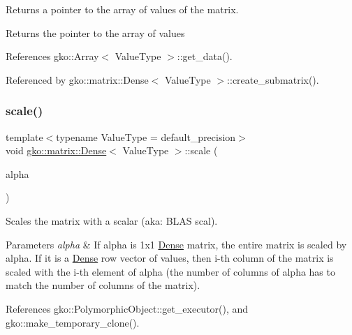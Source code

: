 Returns a pointer to the array of values of the matrix. 

\begin{DoxyReturn}{Returns}
the pointer to the array of values 
\end{DoxyReturn}


References gko\+::\+Array$<$ Value\+Type $>$\+::get\+\_\+data().



Referenced by gko\+::matrix\+::\+Dense$<$ Value\+Type $>$\+::create\+\_\+submatrix().

\mbox{\label{classgko_1_1matrix_1_1Dense_a35cb8dfff52daf3aa8995597d26981ec}} 
\subsubsection{\texorpdfstring{scale()}{scale()}}
{\footnotesize\ttfamily template$<$typename Value\+Type = default\+\_\+precision$>$ \\
void \hyperlink{classgko_1_1matrix_1_1Dense}{gko\+::matrix\+::\+Dense}$<$ Value\+Type $>$\+::scale (\begin{DoxyParamCaption}\item[{const \hyperlink{classgko_1_1LinOp}{Lin\+Op} $\ast$}]{alpha }\end{DoxyParamCaption})\hspace{0.3cm}{\ttfamily [inline]}}



Scales the matrix with a scalar (aka\+: B\+L\+AS scal). 


\begin{DoxyParams}{Parameters}
{\em alpha} & If alpha is 1x1 \hyperlink{classgko_1_1matrix_1_1Dense}{Dense} matrix, the entire matrix is scaled by alpha. If it is a \hyperlink{classgko_1_1matrix_1_1Dense}{Dense} row vector of values, then i-\/th column of the matrix is scaled with the i-\/th element of alpha (the number of columns of alpha has to match the number of columns of the matrix). \\
\hline
\end{DoxyParams}


References gko\+::\+Polymorphic\+Object\+::get\+\_\+executor(), and gko\+::make\+\_\+temporary\+\_\+clone().

\mbox{\label{classgko_1_1matrix_1_1Dense_a64ea8e876f5390a535a2ef486bd5ab9a}} 
